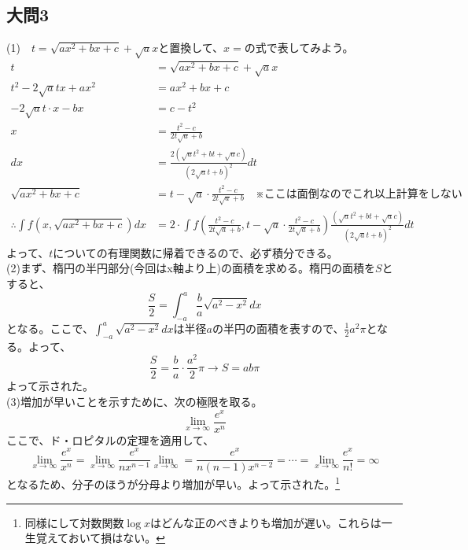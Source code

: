 \documentclass[a4j,dvipdfmx]{jsarticle}
\begin{document}
\subsection*{大問3}
(1)　$\displaystyle t=\sqrt{ax^2+bx+c}+\sqrt{a}x$と置換して、$x=$の式で表してみよう。
\begin{align*}
    t&=\sqrt{ax^2+bx+c}+\sqrt{a}x\\
    t^2-2\sqrt{a}tx+ax^2&=ax^2+bx+c\\
    -2\sqrt{a}t\cdot x-bx&=c-t^2\\
    x&=\frac{t^2-c}{2t\sqrt{a}+b}\\
    dx&=\frac{2(\sqrt{a}t^2+bt+\sqrt{a}c)}{(2\sqrt{a}t+b)^2}dt\\
    \sqrt{ax^2+bx+c}&=t-\sqrt{a}\cdot\frac{t^2-c}{2t\sqrt{a}+b}\quad\text{※ここは面倒なのでこれ以上計算をしない}\\
    \therefore\int f(x,\sqrt{ax^2+bx+c})dx&=2\cdot\int f(\frac{t^2-c}{2t\sqrt{a}+b},t-\sqrt{a}\cdot\frac{t^2-c}{2t\sqrt{a}+b})\frac{(\sqrt{a}t^2+bt+\sqrt{a}c)}{(2\sqrt{a}t+b)^2}dt
\end{align*}
よって、$t$についての有理関数に帰着できるので、必ず積分できる。\\

(2)まず、楕円の半円部分(今回はx軸より上)の面積を求める。楕円の面積を$S$とすると、
\begin{equation*}
    \frac{S}{2}=\int_{-a}^a\frac{b}{a}\sqrt{a^2-x^2}dx
\end{equation*}
となる。ここで、$\displaystyle \int_{-a}^{a}\sqrt{a^2-x^2}dx$は半径$a$の半円の面積を表すので、$\frac{1}{2}a^2\pi$となる。よって、
\begin{equation*}
    \frac{S}{2}=\frac{b}{a}\cdot \frac{a^2}{2}\pi\to S=ab\pi
\end{equation*}
よって示された。\\

(3)増加が早いことを示すために、次の極限を取る。
\begin{equation*}
    \lim_{x\to\infty}\frac{e^x}{x^n}
\end{equation*}
ここで、ド・ロピタルの定理を適用して、
\begin{equation*}
    \lim_{x\to\infty}\frac{e^x}{x^n}=\lim_{x\to\infty}\frac{e^x}{nx^{n-1}}\lim_{x\to\infty}=\frac{e^x}{n(n-1)x^{n-2}}=\cdots=\lim_{x\to\infty}\frac{e^x}{n!}=\infty
\end{equation*}
となるため、分子のほうが分母より増加が早い。よって示された。\footnote{同様にして対数関数$\log x$はどんな正のべきよりも増加が遅い。これらは一生覚えておいて損はない。}
\newpage
\end{document}
